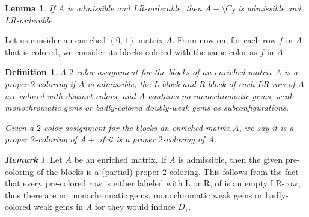 \documentclass[12pt]{book}
\theoremstyle{plain}
\newtheorem{lema}[teo]{Lemma}
\newtheorem{defn}[teo]{Definition}
\theoremstyle{remark}
\newtheorem{remark}[teo]{\textbf{\textit{Remark}}}
\begin{document}
\begin{lema} \label{lema:A+_tb_es_adm} %
	If $A$ is admissible and LR-orderable, then $A+ \setminus C_f$ is admissible and LR-orderable.
\end{lema} 


	Let us consider an enriched $(0,1)$-matrix $A$. From now on, for each row $f$ in $A$ that is colored, we consider its blocks colored with the same color as $f$ in $A$.

\begin{defn} \label{def:proper2coloring}
	A $2$-color assignment for the blocks of an enriched matrix $A$ is a \emph{proper $2$-coloring} if $A$ is admissible, the L-block and R-block of each LR-row of $A$ are colored with distinct colors, and $A$ contains no monochromatic gems, weak monochromatic gems or badly-colored doubly-weak gems as subconfigurations.
	
	Given a $2$-color assignment for the blocks an enriched matrix $A$, we say it is a \emph{proper $2$-coloring of $A+$} if it is a proper $2$-coloring of $A$. 
	
\end{defn}  

\begin{remark} \label{obs:admisible_espartialproper2color}
Let $A$ be an enriched matrix. If $A$ is admissible, then the given pre-coloring of the blocks is a (partial) proper $2$-coloring. This follows from the fact that every pre-colored row is either labeled with L or R, of is an empty LR-row, thus there are no monochromatic gems, monochromatic weak gems or badly-colored weak gems in $A$ for they would induce $D_1$.
\end{remark}
\end{document}

